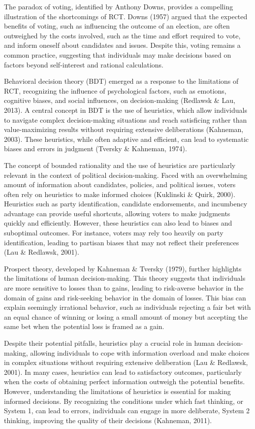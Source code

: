 \documentclass[
]{article}
\begin{document}
The paradox of voting, identified by Anthony Downs, provides a
compelling illustration of the shortcomings of RCT. Downs (1957) argued
that the expected benefits of voting, such as influencing the outcome of
an election, are often outweighed by the costs involved, such as the
time and effort required to vote, and inform oneself about candidates
and issues. Despite this, voting remains a common practice, suggesting
that individuals may make decisions based on factors beyond
self-interest and rational calculations.

Behavioral decision theory (BDT) emerged as a response to the
limitations of RCT, recognizing the influence of psychological factors,
such as emotions, cognitive biases, and social influences, on
decision-making (Redlawsk \& Lau, 2013). A central concept in BDT is the
use of heuristics, which allow individuals to navigate complex
decision-making situations and reach satisficing rather than
value-maximizing results without requiring extensive deliberations
(Kahneman, 2003). These heuristics, while often adaptive and efficient,
can lead to systematic biases and errors in judgment (Tversky \&
Kahneman, 1974).

The concept of bounded rationality and the use of heuristics are
particularly relevant in the context of political decision-making. Faced
with an overwhelming amount of information about candidates, policies,
and political issues, voters often rely on heuristics to make informed
choices (Kuklinski \& Quirk, 2000). Heuristics such as party
identification, candidate endorsements, and incumbency advantage can
provide useful shortcuts, allowing voters to make judgments quickly and
efficiently. However, these heuristics can also lead to biases and
suboptimal outcomes. For instance, voters may rely too heavily on party
identification, leading to partisan biases that may not reflect their
preferences (Lau \& Redlawsk, 2001).

Prospect theory, developed by Kahneman \& Tversky (1979), further
highlights the limitations of human decision-making. This theory
suggests that individuals are more sensitive to losses than to gains,
leading to risk-averse behavior in the domain of gains and risk-seeking
behavior in the domain of losses. This bias can explain seemingly
irrational behavior, such as individuals rejecting a fair bet with an
equal chance of winning or losing a small amount of money but accepting
the same bet when the potential loss is framed as a gain.

Despite their potential pitfalls, heuristics play a crucial role in
human decision-making, allowing individuals to cope with information
overload and make choices in complex situations without requiring
extensive deliberation (Lau \& Redlawsk, 2001). In many cases,
heuristics can lead to satisfactory outcomes, particularly when the
costs of obtaining perfect information outweigh the potential benefits.
However, understanding the limitations of heuristics is essential for
making informed decisions. By recognizing the conditions under which
fast thinking, or System 1, can lead to errors, individuals can engage
in more deliberate, System 2 thinking, improving the quality of their
decisions (Kahneman, 2011).
\end{document}
